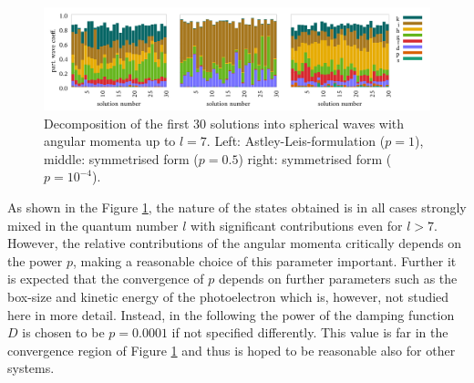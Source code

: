 \begin{figure}
\includegraphics[width=\textwidth]{Figures/Ifem_forms}
\caption{Decomposition of the first 30 solutions into spherical waves with angular momenta up to $l=7$.
Left: Astley-Leis-formulation ($p=1$), middle: symmetrised form ($p=0.5$) right: symmetrised form ($p=10^{-4}$).}
\label{fig:IFEMform_project}
\end{figure}

As shown in the Figure \ref{fig:IFEMform_project}, the nature of the states obtained is in all cases strongly mixed in the quantum number $l$ with significant contributions even for $l>7$.
However, the relative contributions of the angular momenta critically depends on the power $p$, making a reasonable choice of this parameter important.
Further it is expected that the convergence of $p$ depends on further parameters such as the box-size and kinetic energy of the photoelectron which is, however, not studied here in more detail.
Instead, in the following the power of the damping function $D$ is chosen to be $p=0.0001$ if not specified differently.
This value is far in the convergence region of Figure \ref{fig:IFEMform_project} and thus is hoped to be reasonable also for other systems.


